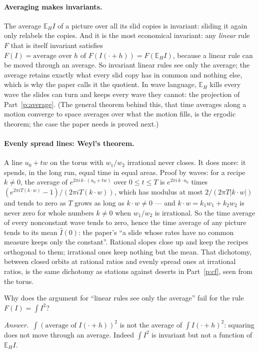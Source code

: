 \documentclass[10pt]{article}
\theoremstyle{plain}
\theoremstyle{definition}
\newcommand{\answer}{\par\smallskip\noindent\textit{Answer.}\ }
\newcommand{\E}{\mathbb{E}}
\begin{document}
\paragraph{Averaging makes invariants.}
The average $\E_HI$ of a picture over all its slid copies is invariant:
sliding it again only relabels the copies. And it is the most economical
invariant: any \emph{linear} rule $F$ that is itself invariant satisfies
$F(I)=\text{average over }h\text{ of }F(I(\cdot+h))=F(\E_HI)$, because a
linear rule can be moved through an average. So invariant linear rules see
only the average; the average retains exactly what every slid copy has in
common and nothing else, which is why the paper calls it the quotient. In
wave language, $\E_H$ kills every wave the slides can turn and keeps every
wave they cannot: the projection of Part~\ref{p:average}. (The general
theorem behind this, that time averages along a motion converge to space
averages over what the motion fills, is the ergodic theorem; the case the
paper needs is proved next.)

\paragraph{Evenly spread lines: Weyl's theorem.}
A line $u_0+tw$ on the torus with $w_1/w_2$ irrational never closes. It does
more: it spends, in the long run, equal time in equal areas. Proof by waves:
for a recipe $k\ne0$, the average of $e^{2\pi i\,k\cdot(u_0+tw)}$ over
$0\le t\le T$ is $e^{2\pi i\,k\cdot u_0}$ times
$(e^{2\pi iT(k\cdot w)}-1)/(2\pi iT(k\cdot w))$, which has modulus at most
$2/(2\pi T|k\cdot w|)$ and tends to zero as $T$ grows as long as
$k\cdot w\ne0$ --- and $k\cdot w=k_1w_1+k_2w_2$ is never zero for whole
numbers $k\ne0$ when $w_1/w_2$ is irrational. So the time average of every
nonconstant wave tends to zero, hence the time average of any picture tends
to its mean $\hat I(0)$: the paper's ``a slide whose rates have no common
measure keeps only the constant''. Rational slopes close up and keep the
recipes orthogonal to them; irrational ones keep nothing but the mean.
That dichotomy, between closed orbits at rational ratios and evenly spread
ones at irrational ratios, is the same dichotomy as stations against
deserts in Part~\ref{p:cf}, seen from the torus.

\begin{checkyourself}
Why does the argument for ``linear rules see only the average'' fail for
the rule $F(I)=\int I^2$?
\answer $\int(\text{average of }I(\cdot+h))^2$ is not the average of
$\int I(\cdot+h)^2$: squaring does not move through an average. Indeed
$\int I^2$ is invariant but not a function of $\E_HI$.
\end{checkyourself}
\end{document}
